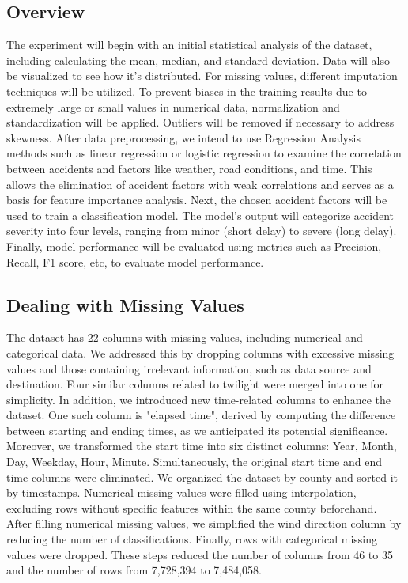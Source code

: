 \documentclass[10pt,twocolumn,letterpaper]{article}
\begin{document}
\begin{CJK}{UTF8}{bsmi}
\subsection{Overview}
The experiment will begin with an initial statistical analysis of the dataset, including calculating the mean, median, and standard deviation. Data will also be visualized to see how it's distributed. For missing values, different imputation techniques will be utilized. To prevent biases in the training results due to extremely large or small values in numerical data, normalization and standardization will be applied. Outliers will be removed if necessary to address skewness. After data preprocessing, we intend to use Regression Analysis methods such as linear regression or logistic regression to examine the correlation between accidents and factors like weather, road conditions, and time. This allows the elimination of accident factors with weak correlations and serves as a basis for feature importance analysis. Next, the chosen accident factors will be used to train a classification model. The model’s output will categorize accident severity into four levels, ranging from minor (short delay) to severe (long delay). Finally, model performance will be evaluated using metrics such as Precision, Recall, F1 score, etc, to evaluate model performance.

\subsection{Dealing with Missing Values}
The dataset has 22 columns with missing values, including numerical and categorical data. We addressed this by dropping columns with excessive missing values and those containing irrelevant information, such as data source and destination. Four similar columns related to twilight were merged into one for simplicity. In addition, we introduced new time-related columns to enhance the dataset. One such column is "elapsed time", derived by computing the difference between starting and ending times, as we anticipated its potential significance. Moreover, we transformed the start time into six distinct columns: Year, Month, Day, Weekday, Hour, Minute. Simultaneously, the original start time and end time columns were eliminated. We organized the dataset by county and sorted it by timestamps. Numerical missing values were filled using interpolation, excluding rows without specific features within the same county beforehand. After filling numerical missing values, we simplified the wind direction column by reducing the number of classifications. Finally, rows with categorical missing values were dropped. These steps reduced the number of columns from 46 to 35 and the number of rows from 7,728,394 to 7,484,058.


\end{CJK}
\end{document}
